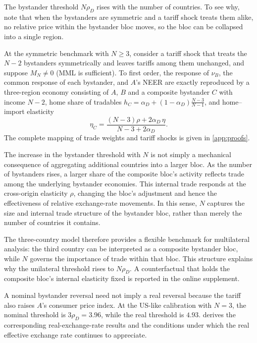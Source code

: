 The bystander threshold $N\rho_D$ rises with the number of countries. To see why, note that when the bystanders are symmetric and a tariff shock treats them alike, no relative price within the bystander bloc moves, so the bloc can be collapsed into a single region.

\begin{proposition}
\label{prop:composite}
At the symmetric benchmark with $N\geq3$, consider a tariff shock that treats the $N-2$ bystanders symmetrically and leaves tariffs among them unchanged, and suppose $M_N\neq0$ (MML is sufficient). To first order, the response of $\nu_B$, the common response of each bystander, and $A$'s NEER are exactly reproduced by a three-region economy consisting of $A$, $B$ and a composite bystander $C$ with income $N-2$, home share of tradables $h_C=\alpha_D+(1-\alpha_D)\frac{N-3}{N-1}$, and home--import elasticity
\begin{equation}
\boxed{\;\eta_C=\frac{(N-3)\rho+2\alpha_D\,\eta}{N-3+2\alpha_D}.\;}
\label{eq:etaC}
\end{equation}
The complete mapping of trade weights and tariff shocks is given in \cref{app:proofs}.
\end{proposition}

The increase in the bystander threshold with $N$ is not simply a mechanical consequence of aggregating additional countries into a larger bloc. As the number of bystanders rises, a larger share of the composite bloc's activity reflects trade among the underlying bystander economies. This internal trade responds at the cross-origin elasticity $\rho$, changing the bloc's adjustment and hence the effectiveness of relative exchange-rate movements. In this sense, $N$ captures the size and internal trade structure of the bystander bloc, rather than merely the number of countries it contains.

The three-country model therefore provides a flexible benchmark for multilateral analysis: the third country can be interpreted as a composite bystander bloc, while $N$ governs the importance of trade within that bloc. This structure explains why the unilateral threshold rises to $N\rho_D$. A counterfactual that holds the composite bloc's internal elasticity fixed is reported in the online supplement.

A nominal bystander reversal need not imply a real reversal because the tariff also raises $A$'s consumer price index. At the US-like calibration with $N=3$, the nominal threshold is $3\rho_D=3.96$, while the real threshold is $4.93$.  derives the corresponding real-exchange-rate results and the conditions under which the real effective exchange rate continues to appreciate.

